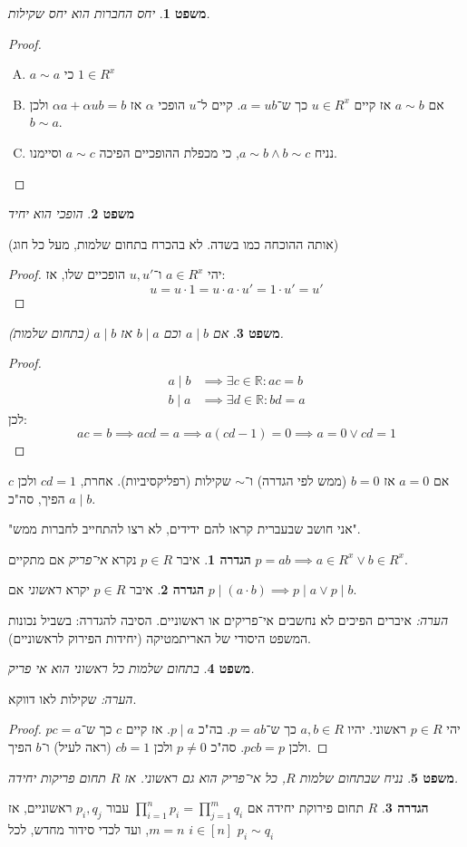 \documentclass[]{article}
\newcommand\R     {\mathbb{R}}
\newcommand\co        {\colon}
\newcommand\ag        {\alpha}
\newtheorem{Theorem}{משפט}
\theoremstyle{definition}
\newtheorem{definition}{הגדרה}
\newcommand\theo  [1] {\begin{Theorem}#1\end{Theorem}}
\newcommand\defi  [1] {\begin{definition}#1\end{definition}}
\begin{document}
	\theo{יחס החברות הוא יחס שקילות. }\begin{proof}
		\begin{enumerate}[A.]
			\item $a \sim a$ כי $1 \in R^x$
			\item אם $a \sim b$ אז קיים $u \in R^x$ כך ש־$a = ub$. קיים ל־$u$ הופכי $\ag$ אז $\ag a + \ag u b = b$ ולכן $b \sim a$. 
			\item נניח $a \sim b \land b \sim c$, כי מכפלת ההופכיים הפיכה $a \sim c$ וסיימנו. 
		\end{enumerate}
	\end{proof}
	\theo{הופכי הוא יחיד} (אותה ההוכחה כמו בשדה. לא בהכרח בתחום שלמות, מעל כל חוג)\begin{proof}
				יהי $a \in R^x$ ו־$u, u'$ הופכיים שלו, אז:
		\[ u = u \cdot 1 = u \cdot a \cdot u' = 1 \cdot u' = u' \]
	\end{proof}
	\theo{אם $a \mid b$ וכם $b \mid a$ אז $a \mid b$ (בתחום שלמות). }\begin{proof}
		\begin{align*}
			a \mid b &\implies \exists c \in \R \co ac = b \\
			b \mid a &\implies \exists d \in \R\co bd = a
		\end{align*}
		לכן: 
		\[ ac = b \implies acd = a \implies a(cd - 1) = 0 \implies a = 0 \lor cd = 1 \]
	\end{proof}
	אם $a = 0$ אז $b = 0$ (ממש לפי הגדרה) ו־$\sim$ שקילות (רפליקסיביות). אחרת, $cd = 1$ ולכן $c$ הפיך, סה"כ $a \mid b$. 
	
	"אני חושב שבעברית קראו להם ידידים, לא רצו להתחייב לחברות ממש". 
	
	
	\defi{איבר $p \in R$ נקרא \textit{אי־פריק} אם מתקיים $p = ab \implies a \in R^x \lor b \in R^x$. }
	
	\defi{איבר $p \in R$ יקרא \textit{ראשוני} אם $p \mid (a \cdot b) \implies p \mid a \lor p \mid b$. }
	\textit{הערה: }איברים הפיכים לא נחשבים אי־פריקים או ראשוניים. הסיבה להגדרה: בשביל נכונות המשפט היסודי של האריתמטיקה (יחידות הפירוק לראשוניים). 
	
	\theo{בתחום שלמות כל ראשוני הוא אי פריק. }
	\textit{הערה: }שקילות לאו דווקא. 
	\begin{proof}
		יהי $p \in R$ ראשוני. יהיו $a, b \in R$ כך ש־$p = ab$. בה"כ $p \mid a$. אז קיים $c$ כך ש־$pc = a$ ולכן $pcb = p$. סה"כ $p \neq 0$ ולכן $cb = 1$ (ראה לעיל) ו־$b$ הפיך. 
	\end{proof}
	\theo{נניח שבתחום שלמות $R$, כל אי־פריק הוא גם ראשוני. אז $R$ תחום פריקות יחידה. }
	\defi{$R$ תחום פירוקת יחידה אם $\prod_{i = 1}^{n}p_i = \prod_{j = 1}^{m}q_i$ עבור $p_i, q_j$ ראשוניים, אז $m = n$, ועד לכדי סידור מחדש, לכל $i \in [n]$ $p_i \sim q_i$}
	
\end{document}
